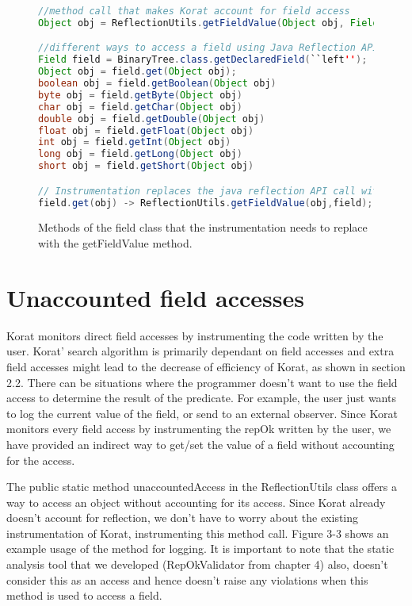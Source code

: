 \begin{figure}
\centering
\begin{lstlisting}[language=Java]
//method call that makes Korat account for field access
Object obj = ReflectionUtils.getFieldValue(Object obj, Field field);

//different ways to access a field using Java Reflection API
Field field = BinaryTree.class.getDeclaredField(``left'');
Object obj = field.get(Object obj);
boolean obj = field.getBoolean(Object obj)
byte obj = field.getByte(Object obj)
char obj = field.getChar(Object obj)
double obj = field.getDouble(Object obj)
float obj = field.getFloat(Object obj)
int obj = field.getInt(Object obj)
long obj = field.getLong(Object obj)
short obj = field.getShort(Object obj)

// Instrumentation replaces the java reflection API call with our API call
field.get(obj) -> ReflectionUtils.getFieldValue(obj,field);
\end{lstlisting}
\caption{Methods of the field class that the instrumentation needs to replace with the getFieldValue method.}
\label{fig:fieldClassInstrumentationMethods}
\end{figure}

\section{Unaccounted field accesses}
Korat monitors direct field accesses by instrumenting the code written by the user. Korat’ search algorithm is primarily dependant on field accesses and extra field accesses might lead to the decrease of efficiency of Korat, as shown in section 2.2. There can be situations where the programmer doesn’t want to use the field access to determine the result of the predicate. For example, the user just wants to log the current value of the field, or send to an external observer. Since Korat monitors every field access by instrumenting the repOk written by the user, we have provided an indirect way to get/set the value of a field without accounting for the access.

\par
The public static method unaccountedAccess in the ReflectionUtils class offers a way to access an object without accounting for its access. Since Korat already doesn’t account for reflection, we don’t have to worry about the existing instrumentation of Korat, instrumenting this method call. Figure 3-3 shows an example usage of the method for logging. It is important to note that the static analysis tool that we developed (RepOkValidator from chapter 4) also, doesn’t consider this as an access and hence doesn’t raise any violations when this method is used to access a field.


